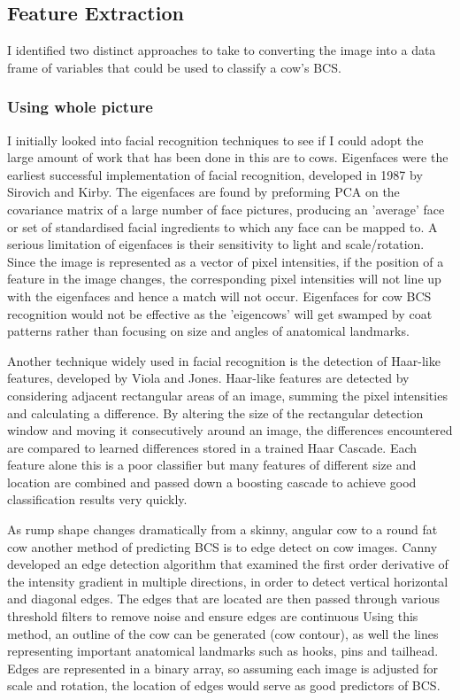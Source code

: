 \documentclass[11pt]{article}
\begin{document}
\subsection{Feature Extraction}


	I identified two distinct approaches to take to converting the image into a data frame of variables that could be used to classify a cow's BCS.

	\subsubsection{Using whole picture}
	I initially looked into facial recognition techniques to see if I could adopt the large amount of work that has been done in this are to cows.
	Eigenfaces were the earliest successful implementation of facial recognition, developed in 1987 by Sirovich and Kirby.
	The eigenfaces are found by preforming PCA on the covariance matrix of a large number of face pictures, producing an 'average' face or set of standardised facial ingredients to which any face can be mapped to.
	A serious limitation of eigenfaces is their sensitivity to light and scale/rotation. 
	Since the image is represented as a vector of pixel intensities, if the position of a feature in the image changes, the corresponding pixel intensities will not line up with the eigenfaces and hence a match will not occur.
	Eigenfaces for cow BCS recognition would not be effective as the 'eigencows' will get swamped by coat patterns rather than focusing on size and angles of anatomical landmarks.



	Another technique widely used in facial recognition is the detection of Haar-like features, developed by Viola and Jones\cite{viola2004}.
	Haar-like features are detected by considering adjacent rectangular areas of an image, summing the pixel intensities and calculating a difference. 
	By altering the size of the rectangular detection window and moving it consecutively around an image, the differences encountered are compared to learned differences stored in a trained Haar Cascade.
	Each feature alone this is a poor classifier but many features of different size and location are combined and passed down a boosting cascade to achieve good classification results very quickly.
	

	As rump shape changes dramatically from a skinny, angular cow to a round fat cow another method of predicting BCS is to edge detect on cow images.
	Canny developed an edge detection algorithm that examined the first order derivative of the intensity gradient in multiple directions, in order to detect vertical horizontal and diagonal edges\cite{Canny1986}.
	The edges that are located are then passed through various threshold filters to remove noise and ensure edges are continuous
	Using this method, an outline of the cow can be generated (cow contour), as well the lines representing important anatomical landmarks such as hooks, pins and tailhead.
	Edges are represented in a binary array, so assuming each image is adjusted for scale and rotation, the location of edges would serve as good predictors of BCS.
\end{document}
